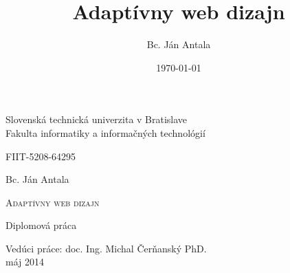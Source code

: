 \documentclass[11pt,a4paper]{article}
\title{\bfseries{ \bf Adaptívny web dizajn}}
\author{Bc. Ján Antala}
\date{\today}
\begin{document}
\setlength{\parindent}{0cm}

\thispagestyle{empty}

\begin{center}
\begin{LARGE}
\textmd{Slovenská technická univerzita v Bratislave}\\
\vspace*{0.2cm}
\textmd{Fakulta informatiky a informačných technológií}
\end{LARGE}

\vspace*{1.0cm}
\begin{Large}
\textmd{FIIT-5208-64295}
\end{Large}

\end{center}

\vspace{5.5cm}

\begin{center}
{\LARGE \textmd{{Bc. Ján Antala}}}
\end{center}

\vspace{0.1cm}
\begin{Huge}
\begin{center}
\textsc{Adaptívny web dizajn}
\end{center}
\end{Huge}

\vspace{0.5cm}
\begin{center}
{\LARGE{\textmd{Diplomová práca}}}\\
\end{center}

\vspace{5.5cm}

\begin{flushleft}
\Large{Vedúci práce: doc. Ing. Michal Čerňanský PhD.} \\
\vspace{1.0cm}
\Large{máj 2014} \\
\end{flushleft}
\end{document}
